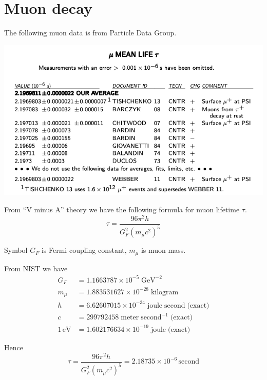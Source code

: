 

\section*{Muon decay}
The following muon data is from Particle Data Group.

\begin{center}
\includegraphics[scale=0.5]{muon-mean-life.png}
\end{center}

From ``V minus A'' theory we have the following formula for muon lifetime $\tau$.
\begin{equation*}
\tau=\frac{96\pi^2h}{G_F^2\left(m_\mu c^2\right)^5}
\end{equation*}

Symbol $G_F$ is Fermi coupling constant, $m_\mu$ is muon mass.

\bigskip
From NIST we have
\begin{align*}
G_F&=1.1663787\times10^{-5}\;\text{GeV}^{-2}
\\
m_\mu&=1.883531627\times10^{-28}\;\text{kilogram}
\\
h&=6.62607015\times10^{-34}\;\text{joule}\;\text{second}\;\text{(exact)}
\\
c&=299792458\;\text{meter}\;\text{second}^{-1}\;\text{(exact)}
\\
1\,\text{eV}&=1.602176634\times10^{-19}\;\text{joule}\;\text{(exact)}
\end{align*}

Hence
\begin{equation*}
\tau=\frac{96\pi^2h}{G_F^2\left(m_\mu c^2\right)^5}
=2.18735\times10^{-6}\,\text{second}
\end{equation*}

